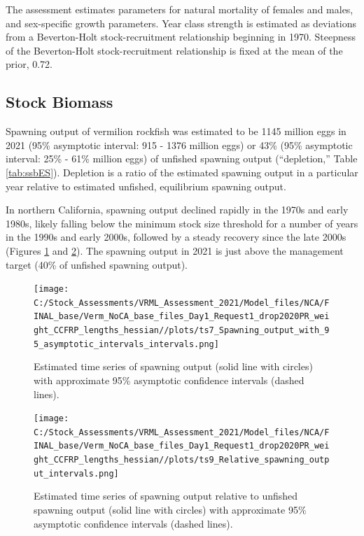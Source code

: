\documentclass[
  english,
  a4paper,
]{article}
\begin{document}
The assessment estimates parameters for natural mortality of females and males,
and sex-specific
growth parameters. Year class strength is estimated as deviations from a Beverton-Holt stock-recruitment relationship beginning in 1970. Steepness of
the Beverton-Holt stock-recruitment relationship is fixed at the mean of the prior,
0.72.

\FloatBarrier

\hypertarget{stock-biomass}{%
\subsection*{Stock Biomass}\label{stock-biomass}}

Spawning output of vermilion rockfish was estimated to be
1145 million eggs in 2021 (95\% asymptotic interval:
915 - 1376 million eggs) or
43\%
(95\% asymptotic interval:
25\% - 61\% million eggs)
of unfished spawning output (``depletion,'' Table \ref{tab:ssbES}). Depletion
is a ratio of the estimated spawning output in a particular year relative to
estimated
unfished, equilibrium spawning output.

In northern California, spawning output declined rapidly in the 1970s and early
1980s, likely falling below the minimum stock size threshold for a number of
years in the 1990s and early 2000s, followed by a steady recovery since the
late 2000s (Figures \ref{fig:ssbES} and \ref{fig:deplES}). The spawning output
in 2021 is just above the management target (40\% of unfished spawning output).

\begin{figure}
\centering
\texttt{[image: C:/Stock\_Assessments/VRML\_Assessment\_2021/Model\_files/NCA/FINAL\_base/Verm\_NoCA\_base\_files\_Day1\_Request1\_drop2020PR\_weight\_CCFRP\_lengths\_hessian//plots/ts7\_Spawning\_output\_with\_95\_asymptotic\_intervals\_intervals.png]}
\caption{Estimated time series of spawning output (solid line with circles) with approximate 95\% asymptotic confidence intervals (dashed lines).\label{fig:ssbES}}
\end{figure}

\begin{figure}
\centering
\texttt{[image: C:/Stock\_Assessments/VRML\_Assessment\_2021/Model\_files/NCA/FINAL\_base/Verm\_NoCA\_base\_files\_Day1\_Request1\_drop2020PR\_weight\_CCFRP\_lengths\_hessian//plots/ts9\_Relative\_spawning\_output\_intervals.png]}
\caption{Estimated time series of spawning output relative to unfished spawning output (solid line with circles) with approximate 95\% asymptotic confidence intervals (dashed lines).\label{fig:deplES}}
\end{figure}
\end{document}
